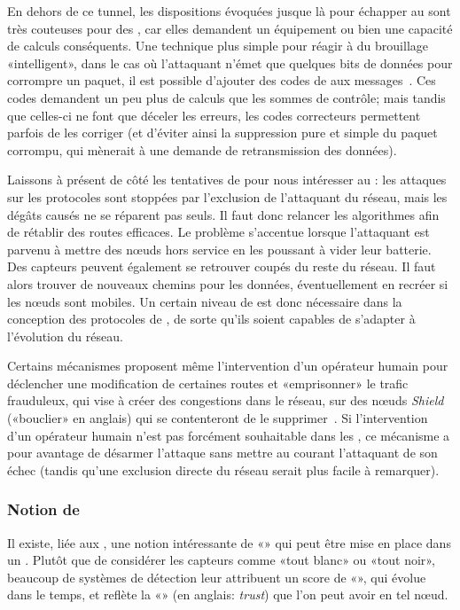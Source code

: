 En dehors de ce tunnel, les dispositions évoquées jusque là pour échapper au  sont très couteuses pour des \rcs, car elles demandent un équipement ou bien une capacité de calculs conséquents.
Une technique plus simple pour réagir à du brouillage «intelligent», dans le cas où l'attaquant n'émet que quelques bits de données pour corrompre un paquet, il est possible d'ajouter des codes de  aux messages~\cite{PI11}.
Ces codes demandent un peu plus de calculs que les sommes de contrôle; mais tandis que celles-ci ne font que déceler les erreurs, les codes correcteurs permettent parfois de les corriger (et d'éviter ainsi la suppression pure et simple du paquet corrompu, qui mènerait à une demande de retransmission des données).

Laissons à présent de côté les tentatives de  pour nous intéresser au : les attaques sur les protocoles sont stoppées par l'exclusion de l'attaquant du réseau, mais les dégâts causés ne se réparent pas seuls.
Il faut donc relancer les algorithmes afin de rétablir des routes efficaces.
Le problème s'accentue lorsque l'attaquant est parvenu à mettre des nœuds hors service en les poussant à vider leur batterie.
Des capteurs peuvent également se retrouver coupés du reste du réseau.
Il faut alors trouver de nouveaux chemins pour les données, éventuellement en recréer si les nœuds sont mobiles.
Un certain niveau de \resilience est donc nécessaire dans la conception des protocoles de , de sorte qu'ils soient capables de s'adapter à l'évolution du réseau.

Certains mécanismes proposent même l'intervention d'un opérateur humain pour déclencher une modification de certaines routes et «emprisonner» le trafic frauduleux, qui vise à créer des congestions dans le réseau, sur des nœuds \textit{Shield} («bouclier» en anglais) qui se contenteront de le supprimer~\cite{HSP13}.
Si l'intervention d'un opérateur humain n'est pas forcément souhaitable dans les \rcs, ce mécanisme a pour avantage de désarmer l'attaque sans mettre au courant l'attaquant de son échec (tandis qu'une exclusion directe du réseau serait plus facile à remarquer).

    \subsubsection{Notion de }
Il existe, liée aux \IDS, une notion intéressante de «» qui peut être mise en place dans un \rc.
Plutôt que de considérer les capteurs comme «tout blanc» ou «tout noir», beaucoup de systèmes de détection leur attribuent un score de «\reput», qui évolue dans le temps, et reflète la «» (en anglais: \textit{trust}) que l'on peut avoir en tel nœud.


